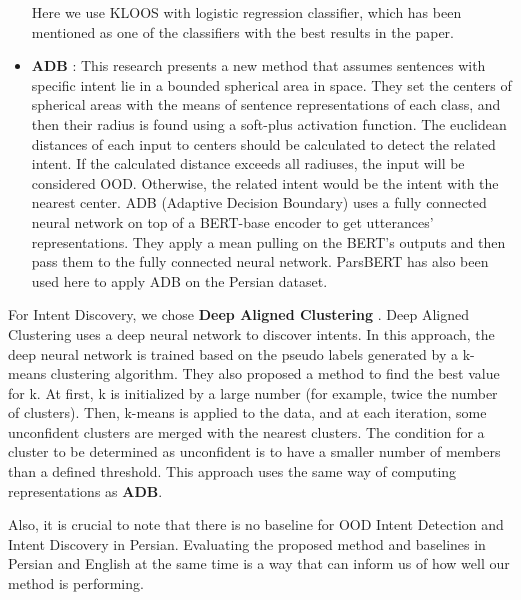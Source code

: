 \documentclass{article}
\begin{document}
\begin{itemize}
                                                      Here we use KLOOS with logistic regression classifier, which has been mentioned as one of the classifiers with the best results in the paper. 
  \item \textbf{ADB} \citep{zhang2021deep}: This research presents a new method that assumes sentences with specific intent lie in a bounded spherical area in space. 
                                          They set the centers of spherical areas with the means of sentence representations of each class, 
                                          and then their radius is found using a soft-plus activation function. 
                                          The euclidean distances of each input to centers should be calculated to detect the related intent. 
                                          If the calculated distance exceeds all radiuses, the input will be considered OOD. Otherwise, 
                                          the related intent would be the intent with the nearest center. 
                                          ADB (Adaptive Decision Boundary) uses a fully connected neural network on top of a BERT-base encoder to get utterances' representations. 
                                          They apply a mean pulling on the BERT's outputs and then pass them to the fully connected neural network.
                                          ParsBERT has also been used here to apply ADB on the Persian dataset.
\end{itemize}
For Intent Discovery, we chose \textbf{Deep Aligned Clustering} \citep{zhang2021discovering}.
Deep Aligned Clustering uses a deep neural network to discover intents. 
In this approach, the deep neural network is trained based on the pseudo labels generated by a k-means clustering algorithm. 
They also proposed a method to find the best value for k. At first, k is initialized by a large number (for example, twice the number of clusters). 
Then, k-means is applied to the data, and at each iteration, some unconfident clusters are merged with the nearest clusters. 
The condition for a cluster to be determined as unconfident is to have a smaller number of members than a defined threshold.
This approach uses the same way of computing representations as \textbf{ADB}.

Also, it is crucial to note that there is no baseline for OOD Intent Detection and Intent Discovery in Persian.
Evaluating the proposed method and baselines in Persian and English at the same time is a way that can inform us of how well our method is performing.
\end{document}
